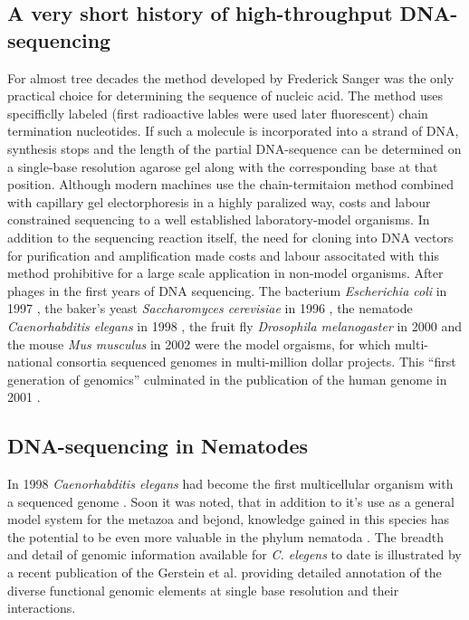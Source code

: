 \subsection{A very short history of high-throughput DNA-sequencing}
\label{his-seq}

For almost tree decades the method developed by Frederick Sanger
\cite{pmid271968} was the only practical choice for determining the
sequence of nucleic acid. The method uses specifficlly labeled (first
radioactive lables were used later fluorescent) chain termination
nucleotides. If such a molecule is incorporated into a strand of DNA,
synthesis stops and the length of the partial DNA-sequence can be
determined on a single-base resolution agarose gel along with the
corresponding base at that position. Although modern machines use the
chain-termitaion method combined with capillary gel electorphoresis
\cite{pmid2326186} in a highly paralized way, costs and labour
constrained sequencing to a well established laboratory-model
organisms. In addition to the sequencing reaction itself, the need for
cloning into DNA vectors for purification and amplification made costs
and labour associtated with this method prohibitive for a large scale
application in non-model organisms. After phages \cite{pmid1264203} in
the first years of DNA sequencing. The bacterium \textit{Escherichia
  coli} in 1997 \cite{pmid9278503}, the baker's yeast
\textit{Saccharomyces cerevisiae} in 1996 \cite{pmid8849441}, the
nematode \textit{Caenorhabditis elegans} in 1998 \cite{pmid9851916},
the fruit fly \textit{Drosophila melanogaster} in 2000
\cite{adams2000genome} and the mouse \textit{Mus musculus} in 2002
\cite{pmid12466850} were the model orgaisms, for which multi-national
consortia sequenced genomes in multi-million dollar projects. This
``first generation of genomics'' culminated in the publication of the
human genome in 2001 \cite{pmid11181995}.


\subsection{DNA-sequencing in Nematodes}
\label{sec:dna-sequ-nemat}

In 1998 \textit{Caenorhabditis elegans} had become the first
multicellular organism with a sequenced genome
\cite{pmid9851916}. Soon it was noted, that in addition to it's use as
a general model system for the metazoa and bejond, knowledge gained in
this species has the potential to be even more valuable in the phylum
nematoda \cite{blaxter_caenorhabditis_1998}. The breadth and detail of
genomic information available for \textit{C. elegens} to date is
illustrated by a recent publication of the Gerstein et
al. \cite{pmid21177976} providing detailed annotation of the diverse
functional genomic elements at single base resolution and their
interactions.

